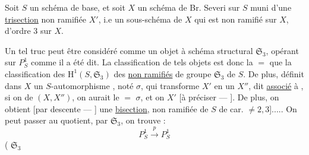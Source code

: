 Soit $S$ un schéma de base, et soit $X$ un schéma de Br. Severi sur $S$ muni d'une \uline{trisection} non ramifiée $X'$, i.e un sous-schéma  de $X$ qui est non ramifié sur $X$, d'ordre 3 sur $X$.

Un tel truc peut être considéré comme un objet à schéma structural $\mathfrak S_3$, opérant sur $P^1_S$ comme il a été dit. La classification de tels objets est donc la $=$ que la classification des  $\mathrm H^1(S,\mathfrak S_3)$ des   \uline{non ramifiés} de  groupe $\mathfrak S_3$ de $S$. De plus,  définit dans $X$ un $S$-automorphisme , noté $\sigma$, qui transforme $X'$ en un $X''$, dit \uline{associé} à  , si on  de $(X,X'')$, on aurait le $=$ $\sigma$, et on  $X'$ [à préciser --- ]. De plus, on obtient [par descente --- ] une \uline{bisection}, non ramifiée \deleted{[\unsure{du moins}}  de $S$ de car. $\ne 2,3$]..... On peut passer au quotient,  par $\mathfrak S_3$,  on trouve  :
\[
P^1_S\xrightarrow{p}P^1_S
\]
( $\mathfrak S_3$ 
